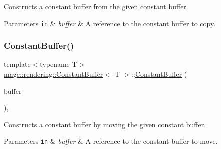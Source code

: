 Constructs a constant buffer from the given constant buffer.


\begin{DoxyParams}[1]{Parameters}
\mbox{\tt in}  & {\em buffer} & A reference to the constant buffer to copy. \\
\hline
\end{DoxyParams}
\mbox{\label{classmage_1_1rendering_1_1_constant_buffer_a1c1c73d617245d7dead836b0d3a00a6f}} 
\subsubsection{\texorpdfstring{Constant\+Buffer()}{ConstantBuffer()}\hspace{0.1cm}{\footnotesize\ttfamily [3/3]}}
{\footnotesize\ttfamily template$<$typename T$>$ \\
\mbox{\hyperlink{classmage_1_1rendering_1_1_constant_buffer}{mage\+::rendering\+::\+Constant\+Buffer}}$<$ T $>$\+::\mbox{\hyperlink{classmage_1_1rendering_1_1_constant_buffer}{Constant\+Buffer}} (\begin{DoxyParamCaption}\item[{\mbox{\hyperlink{classmage_1_1rendering_1_1_constant_buffer}{Constant\+Buffer}}$<$ T $>$ \&\&}]{buffer }\end{DoxyParamCaption})\hspace{0.3cm}{\ttfamily [default]}, {\ttfamily [noexcept]}}

Constructs a constant buffer by moving the given constant buffer.


\begin{DoxyParams}[1]{Parameters}
\mbox{\tt in}  & {\em buffer} & A reference to the constant buffer to move. \\
\hline
\end{DoxyParams}
\mbox{\label{classmage_1_1rendering_1_1_constant_buffer_af75271b7a5550583732e0575b576f088}} 
